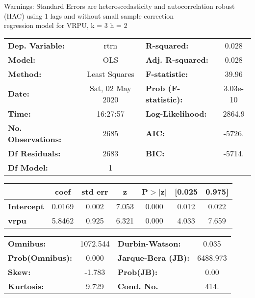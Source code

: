 Warnings: \newline
 [1] Standard Errors are heteroscedasticity and autocorrelation robust (HAC) using 1 lags and without small sample correction\\ 

regression model for VRPU, k = 3 h = 2\begin{center}
\begin{tabular}{lclc}
\toprule
\textbf{Dep. Variable:}    &       rtrn       & \textbf{  R-squared:         } &     0.028   \\
\textbf{Model:}            &       OLS        & \textbf{  Adj. R-squared:    } &     0.028   \\
\textbf{Method:}           &  Least Squares   & \textbf{  F-statistic:       } &     39.96   \\
\textbf{Date:}             & Sat, 02 May 2020 & \textbf{  Prob (F-statistic):} &  3.03e-10   \\
\textbf{Time:}             &     16:27:57     & \textbf{  Log-Likelihood:    } &    2864.9   \\
\textbf{No. Observations:} &        2685      & \textbf{  AIC:               } &    -5726.   \\
\textbf{Df Residuals:}     &        2683      & \textbf{  BIC:               } &    -5714.   \\
\textbf{Df Model:}         &           1      & \textbf{                     } &             \\
\bottomrule
\end{tabular}
\begin{tabular}{lcccccc}
                   & \textbf{coef} & \textbf{std err} & \textbf{z} & \textbf{P$> |$z$|$} & \textbf{[0.025} & \textbf{0.975]}  \\
\midrule
\textbf{Intercept} &       0.0169  &        0.002     &     7.053  &         0.000        &        0.012    &        0.022     \\
\textbf{vrpu}      &       5.8462  &        0.925     &     6.321  &         0.000        &        4.033    &        7.659     \\
\bottomrule
\end{tabular}
\begin{tabular}{lclc}
\textbf{Omnibus:}       & 1072.544 & \textbf{  Durbin-Watson:     } &    0.035  \\
\textbf{Prob(Omnibus):} &   0.000  & \textbf{  Jarque-Bera (JB):  } & 6488.973  \\
\textbf{Skew:}          &  -1.783  & \textbf{  Prob(JB):          } &     0.00  \\
\textbf{Kurtosis:}      &   9.729  & \textbf{  Cond. No.          } &     414.  \\
\bottomrule
\end{tabular}
\end{center}

